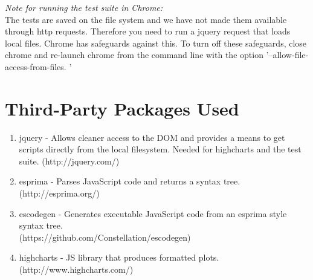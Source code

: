 \documentclass[11pt]{article}
\begin{document}
\textit{Note for running the test suite in Chrome: }\\
The tests are saved on the file system and we have not made them
available through http requests. Therefore you need to run a jquery
request that loads local files. Chrome has safeguards against this. To
turn off these safeguards, close chrome and re-launch chrome from the command
line with the option '--allow-file-access-from-files. '

\section{Third-Party Packages Used}
\begin{enumerate}
\item jquery - Allows cleaner access to the DOM and provides a means
  to get scripts directly from the local filesystem. Needed for highcharts
  and the test suite. (http://jquery.com/)
\item esprima - Parses JavaScript code and returns a syntax tree. (http://esprima.org/)
\item escodegen - Generates executable JavaScript code from an esprima style syntax tree. \\(https://github.com/Constellation/escodegen)
\item highcharts - JS library that produces formatted plots. (http://www.highcharts.com/)
\end{enumerate}
\end{document}
